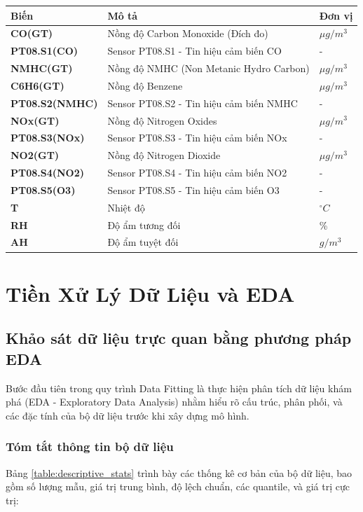 \documentclass[12pt,a4paper]{report}
\newcommand{\theadcolor}{\rowcolor{tableheader}}
\begin{document}
\begin{center}
\begin{tabular}{|l|p{4cm}|l|}
\hline
\theadcolor \textbf{Biến} & \textbf{Mô tả} & \textbf{Đơn vị} \\
\hline
\textbf{CO(GT)} & Nồng độ Carbon Monoxide (Đích đo) & $\mu g/m^3$ \\
\hline
\textbf{PT08.S1(CO)} & Sensor PT08.S1 - Tin hiệu cảm biến CO & - \\
\hline
\textbf{NMHC(GT)} & Nồng độ NMHC (Non Metanic Hydro Carbon) & $\mu g/m^3$ \\
\hline
\textbf{C6H6(GT)} & Nồng độ Benzene & $\mu g/m^3$ \\
\hline
\textbf{PT08.S2(NMHC)} & Sensor PT08.S2 - Tin hiệu cảm biến NMHC & - \\
\hline
\textbf{NOx(GT)} & Nồng độ Nitrogen Oxides & $\mu g/m^3$ \\
\hline
\textbf{PT08.S3(NOx)} & Sensor PT08.S3 - Tin hiệu cảm biến NOx & - \\
\hline
\textbf{NO2(GT)} & Nồng độ Nitrogen Dioxide & $\mu g/m^3$ \\
\hline
\textbf{PT08.S4(NO2)} & Sensor PT08.S4 - Tin hiệu cảm biến NO2 & - \\
\hline
\textbf{PT08.S5(O3)} & Sensor PT08.S5 - Tin hiệu cảm biến O3 & - \\
\hline
\textbf{T} & Nhiệt độ & $^{\circ}C$ \\
\hline
\textbf{RH} & Độ ẩm tương đối & \% \\
\hline
\textbf{AH} & Độ ẩm tuyệt đối & $g/m^3$ \\
\hline
\end{tabular}
\end{center}

\section{Tiền Xử Lý Dữ Liệu và EDA}

\subsection{Khảo sát dữ liệu trực quan bằng phương pháp EDA}
Bước đầu tiên trong quy trình Data Fitting là thực hiện phân tích dữ liệu khám phá (EDA - Exploratory Data Analysis) nhằm hiểu rõ cấu trúc, phân phối, và các đặc tính của bộ dữ liệu trước khi xây dựng mô hình.
 
\subsubsection{Tóm tắt thông tin bộ dữ liệu}
Bảng \ref{table:descriptive_stats} trình bày các thống kê cơ bản của bộ dữ liệu, bao gồm số lượng mẫu, giá trị trung bình, độ lệch chuẩn, các quantile, và giá trị cực trị:
 
\end{document}

